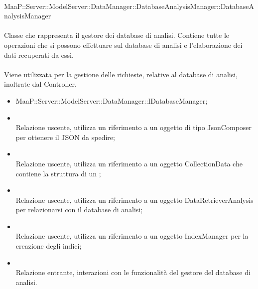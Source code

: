 \\
MaaP::Server::ModelServer::DataManager::DatabaseAnalysisManager::DatabaseAnalysisManager\\
\\
Classe che rappresenta il gestore dei database di analisi. Contiene tutte le operazioni che si possono effettuare sul database di analisi e l'elaborazione dei dati recuperati da essi.\\
\\
Viene utilizzata per la gestione delle richieste, relative al database di analisi, inoltrate dal Controller.\\
\begin{itemize}
\item MaaP::Server::ModelServer::DataManager::IDatabaseManager;
\end{itemize}
\begin{itemize}
\item{}\\
Relazione uscente, utilizza un riferimento a un oggetto di tipo JsonComposer per ottenere il JSON da spedire;
\item{}\\
Relazione uscente, utilizza un riferimento a un oggetto CollectionData che contiene la struttura di un ;
\item{}\\
Relazione uscente, utilizza un riferimento a un oggetto DataRetrieverAnalysis per relazionarsi con il database di analisi;
\item{}\\
Relazione uscente, utilizza un riferimento a un oggetto IndexManager per la creazione degli indici;
\item{}\\
Relazione entrante, interazioni con le funzionalità del gestore del database di analisi.
\end{itemize}

